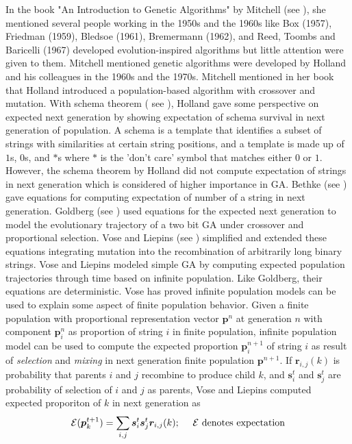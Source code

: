 In the book "An Introduction to Genetic Algorithms" by Mitchell (see \cite{Mitchell1999}), 
she mentioned several people working in the 1950s and the 1960s like Box (1957), Friedman (1959),
Bledsoe (1961), Bremermann (1962), and Reed, Toombs and Baricelli (1967) developed evolution-inspired algorithms 
but little attention were given to them. Mitchell mentioned genetic algorithms were developed by Holland 
and his colleagues in the 1960s and the 1970s. Mitchell mentioned in her book that Holland introduced 
a population-based algorithm with crossover and mutation. With schema theorem ( see \cite{Holland1975}), 
Holland gave some perspective on expected next generation by showing expectation of schema survival in 
next generation of population. A schema is a template that identifies a subset of strings with similarities 
at certain string positions, and a template is made up of $1$s, $0$s, and $\ast$s where 
$\ast$ is the 'don't care' symbol that matches either $0$ or $1$. However, the schema theorem by Holland 
did not compute expectation of strings in next generation which is considered of higher importance in GA. 
Bethke (see \cite{Bethke1981}) gave equations for computing expectation of number of a string in next generation. 
Goldberg (see \cite{Goldberg1987}) used equations 
for the expected next generation to model the evolutionary trajectory of a two bit GA under crossover 
and proportional selection. Vose and Liepins (see \cite{VoseLiepins1991}) simplified and extended 
these equations integrating mutation into the recombination of arbitrarily long binary strings. 
Vose and Liepins modeled simple GA by computing expected population trajectories through time based 
on infinite population. Like Goldberg, their equations are deterministic. 
Vose has proved infinite population models can be used  to explain some aspect of finite population behavior. 
Given a finite population with proportional representation vector $\bm{p}^n$ at generation $n$ with 
component $\bm{p}_i^n$ as proportion of string $i$ in finite population, infinite population model 
can be used to compute the expected proportion $\bm{p}_i^{n+1}$ of string $i$ as result of \textit{selection} and 
\textit{mixing} in next generation finite population $\bm{p}^{n+1}$.  
If $\bm{r}_{i,j}(k)$ is probability that parents $i$ and $j$ recombine to produce child $k$, and $\bm{s}_i^t$ and $\bm{s}_j^t$ 
are probability of selection of $i$ and $j$ as parents, Vose and Liepins computed expected proporiton of $k$ in next generation as
\[
\mathcal{E}(\bm{p}_k^{t+1}) = \sum_{i,j} \bm{s}_i^t \bm{s}_j^t \bm{r}_{i,j}(k) ; \text{\hspace{10pt} $\mathcal{E}$ denotes expectation}
\]
